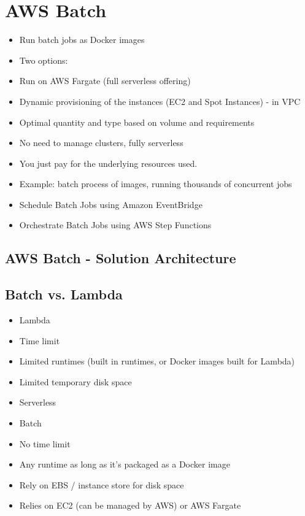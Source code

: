 \section{AWS Batch}
\begin{itemize}
    \item Run batch jobs as Docker images
    \item Two options:
    \item Run on AWS Fargate (full serverless offering)
    \item Dynamic provisioning of the instances (EC2 and Spot Instances) - in VPC
    \item Optimal quantity and type based on volume and requirements
    \item No need to manage clusters, fully serverless
    \item You just pay for the underlying resources used.
    \item Example: batch process of images, running thousands of concurrent jobs
    \item Schedule Batch Jobs using Amazon EventBridge
    \item Orchestrate Batch Jobs using AWS Step Functions
\end{itemize}

\subsection{AWS Batch - Solution Architecture}

\subsection{Batch vs. Lambda}
\begin{itemize}
    \item Lambda
    \item Time limit
    \item Limited runtimes (built in runtimes, or Docker images built for Lambda)
    \item Limited temporary disk space
    \item Serverless
    \item Batch
    \item No time limit
    \item Any runtime as long as it's packaged as a Docker image
    \item Rely on EBS / instance store for disk space
    \item Relies on EC2 (can be managed by AWS) or AWS Fargate
\end{itemize}

